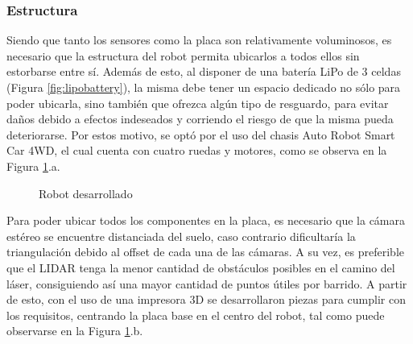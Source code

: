 \subsubsection{Estructura}
Siendo que tanto los sensores como la placa son relativamente voluminosos, es necesario que la estructura del robot permita ubicarlos a todos ellos sin estorbarse entre sí. Además de esto, al disponer de una batería LiPo de 3 celdas (Figura \ref{fig:lipobattery}), la misma debe tener un espacio dedicado no sólo para poder ubicarla, sino también que ofrezca algún tipo de resguardo, para evitar daños debido a efectos indeseados y corriendo el riesgo de que la misma pueda deteriorarse. Por estos motivo, se optó por el uso del chasis Auto Robot Smart Car 4WD, el cual cuenta con cuatro ruedas y motores, como se observa en la Figura \ref{fig:developedrobot}.a.
\begin{figure}
    \centering
    \qquad
    \caption{Robot desarrollado}
    \label{fig:developedrobot}
\end{figure}

Para poder ubicar todos los componentes en la placa, es necesario que la cámara estéreo se encuentre distanciada del suelo, caso contrario dificultaría la triangulación debido al offset de cada una de las cámaras. A su vez, es preferible que el LIDAR tenga la menor cantidad de obstáculos posibles en el camino del láser, consiguiendo así una mayor cantidad de puntos útiles por barrido. A partir de esto, con el uso de una impresora 3D se desarrollaron piezas para cumplir con los requisitos, centrando la placa base en el centro del robot, tal como puede observarse en la Figura \ref{fig:developedrobot}.b. 





